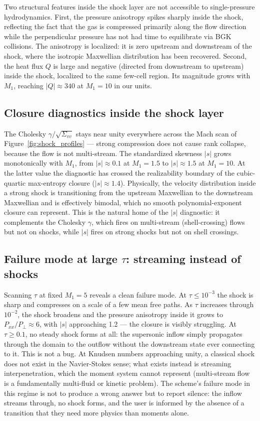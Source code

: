 \documentclass[11pt,letterpaper]{article}
\begin{document}
Two structural features inside the shock layer are not accessible to single-pressure hydrodynamics. First, the pressure anisotropy spikes sharply inside the shock, reflecting the fact that the gas is compressed primarily along the flow direction while the perpendicular pressure has not had time to equilibrate via BGK collisions. The anisotropy is localized: it is zero upstream and downstream of the shock, where the isotropic Maxwellian distribution has been recovered. Second, the heat flux $Q$ is large and negative (directed from downstream to upstream) inside the shock, localized to the same few-cell region. Its magnitude grows with $M_1$, reaching $|Q| \approx 340$ at $M_1 = 10$ in our units.

\subsection{Closure diagnostics inside the shock layer}

The Cholesky $\gamma/\sqrt{\Sigma_{vv}}$ stays near unity everywhere across the Mach scan of Figure~\ref{fig:shock_profiles} --- strong compression does not cause rank collapse, because the flow is not multi-stream. The standardized skewness $|s|$ grows monotonically with $M_1$, from $|s| \approx 0.1$ at $M_1 = 1.5$ to $|s| \approx 1.5$ at $M_1 = 10$. At the latter value the diagnostic has crossed the realizability boundary of the cubic-quartic max-entropy closure ($|s| \approx 1.4$). Physically, the velocity distribution inside a strong shock is transitioning from the upstream Maxwellian to the downstream Maxwellian and is effectively bimodal, which no smooth polynomial-exponent closure can represent. This is the natural home of the $|s|$ diagnostic: it complements the Cholesky $\gamma$, which fires on multi-stream (shell-crossing) flows but not on shocks, while $|s|$ fires on strong shocks but not on shell crossings.

\subsection{Failure mode at large $\tau$: streaming instead of shocks}

Scanning $\tau$ at fixed $M_1 = 5$ reveals a clean failure mode. At $\tau \leq 10^{-3}$ the shock is sharp and compresses on a scale of a few mean free paths. As $\tau$ increases through $10^{-2}$, the shock broadens and the pressure anisotropy inside it grows to $P_{xx}/P_\perp \approx 6$, with $|s|$ approaching 1.2 --- the closure is visibly struggling. At $\tau \geq 0.1$, no steady shock forms at all: the supersonic inflow simply propagates through the domain to the outflow without the downstream state ever connecting to it. This is not a bug. At Knudsen numbers approaching unity, a classical shock does not exist in the Navier-Stokes sense; what exists instead is streaming interpenetration, which the moment system cannot represent (multi-stream flow is a fundamentally multi-fluid or kinetic problem). The scheme's failure mode in this regime is not to produce a wrong answer but to report silence: the inflow streams through, no shock forms, and the user is informed by the absence of a transition that they need more physics than moments alone.
\end{document}
